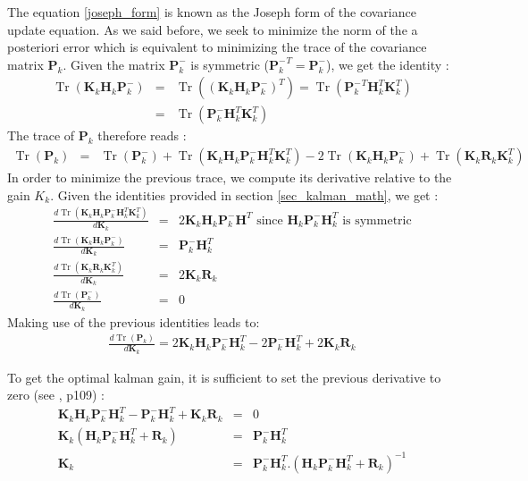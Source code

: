 \documentclass[10pt,oneside]{scrartcl}
\newcommand\matrice[1]{\mathbf#1}
\newcommand\trace{\operatorname*{Tr}}
\begin{document}
The equation \ref{joseph_form} is known as the Joseph form of the covariance update equation. As we said before, we seek to minimize the norm of the a posteriori error which is equivalent to minimizing the trace of the covariance matrix $\matrice{P_k}$. Given the matrix $\matrice{P^-_k}$ is symmetric (${\matrice{P^-_k}}^T = \matrice{P^-_k}$), we get the identity :
\begin{eqnarray}
\nonumber  \trace(\matrice{K_k} \matrice{H}_k \matrice{P^-_k}) &=& \trace((\matrice{K_k} \matrice{H}_k \matrice{P^-_k})^T) = \trace( {\matrice{P^-_k}}^T \matrice{H}_k^T\matrice{K_k}^T)\\
\nonumber 					         &=& \trace( \matrice{P^-_k} \matrice{H}_k^T\matrice{K_k}^T)
\end{eqnarray}
The trace of $\matrice{P_k}$ therefore reads :
\begin{eqnarray}
\trace(\matrice{P_k}) &=& \trace(\matrice{P^-_k}) + \trace(\matrice{K_k} \matrice{H}_k \matrice{P^-_k} \matrice{H}_k^T \matrice{K_k}^T) - 2 \trace(\matrice{K_k} \matrice{H}_k \matrice{P^-_k}) + \trace(\matrice{K_k} \matrice{R_k} \matrice{K_k}^T)
\end{eqnarray}
In order to minimize the previous trace, we compute its derivative relative to the gain $K_k$. Given the identities provided in section \ref{sec_kalman_math}, we get :
\begin{eqnarray}
\frac{d \trace(\matrice{K_k}\matrice{H}_k \matrice{P^-_k} \matrice{H}_k^T\matrice{K_k}^T)}{d \matrice{K_k} } &=& 2 \matrice{K_k}\matrice{H}_k \matrice{P^-_k} \matrice{H}^T \mbox{ since  } \matrice{H}_k \matrice{P^-_k} \matrice{H}_k^T \mbox{ is symmetric}\\
\frac{d \trace(\matrice{K_k} \matrice{H}_k \matrice{P^-_k})}{d \matrice{K_k}} &=& \matrice{P^-_k} \matrice{H}_k^T\\
\frac{d \trace(\matrice{K_k} \matrice{R_k} \matrice{K_k}^T) }{d \matrice{K_k}} &=& 2 \matrice{K_k} \matrice{R_k}\\
\frac{d \trace(\matrice{P^-_k})}{d \matrice{K_k}} &=& 0
\end{eqnarray}
Making use of the previous identities leads to:
\begin{eqnarray}
\frac{d\trace(\matrice{P_k})}{d \matrice{K_k} } = 2 \matrice{K_k}\matrice{H}_k \matrice{P^-_k} \matrice{H}_k^T - 2 \matrice{P^-_k} \matrice{H}_k^T + 2 \matrice{K_k} \matrice{R_k}
\end{eqnarray}

To get the optimal kalman gain, it is sufficient to set the previous derivative to zero (see \cite{Gelb1986}, p109) :
\begin{eqnarray}
\matrice{K_k}\matrice{H}_k \matrice{P^-_k} \matrice{H}_k^T - \matrice{P^-_k} \matrice{H}_k^T + \matrice{K_k} \matrice{R_k} &=& 0\\
\matrice{K_k} (\matrice{H}_k \matrice{P^-_k} \matrice{H}_k^T +\matrice{R_k}) &=& \matrice{P^-_k} \matrice{H}_k^T\\
\label{eq_kalman_gain} \matrice{K_k} &=& \matrice{P^-_k} \matrice{H}_k^T . (\matrice{H}_k \matrice{P^-_k} \matrice{H}_k^T +\matrice{R_k})^{-1}
\end{eqnarray}
\end{document}
